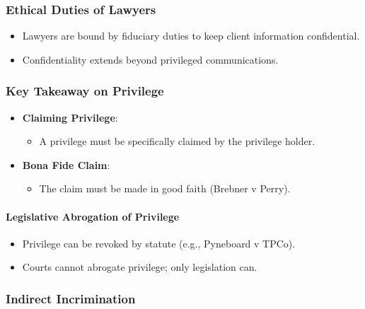 \subsubsection{Ethical Duties of
Lawyers}\label{ethical-duties-of-lawyers}

\begin{itemize}
\tightlist
\item
  Lawyers are bound by fiduciary duties to keep client information
  confidential.
\item
  Confidentiality extends beyond privileged communications.
\end{itemize}

\subsubsection{Key Takeaway on
Privilege}\label{key-takeaway-on-privilege}

\begin{itemize}
\tightlist
\item
  \textbf{Claiming Privilege}:

  \begin{itemize}
  \tightlist
  \item
    A privilege must be specifically claimed by the privilege holder.
  \end{itemize}
\item
  \textbf{Bona Fide Claim}:

  \begin{itemize}
  \tightlist
  \item
    The claim must be made in good faith (Brebner v Perry).
  \end{itemize}
\end{itemize}

\paragraph{Legislative Abrogation of
Privilege}\label{legislative-abrogation-of-privilege}

\begin{itemize}
\tightlist
\item
  Privilege can be revoked by statute (e.g., Pyneboard v TPCo).
\item
  Courts cannot abrogate privilege; only legislation can.
\end{itemize}

\subsubsection{Indirect Incrimination}\label{indirect-incrimination}

